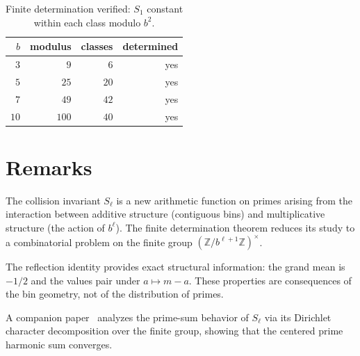 \documentclass[12pt]{amsart}
\theoremstyle{definition}
\theoremstyle{remark}
\begin{document}
\begin{table}[h]
\centering
\begin{tabular}{rrrr}
\toprule
$b$ & modulus & classes & determined \\
\midrule
$3$ & $9$ & $6$ & yes \\
$5$ & $25$ & $20$ & yes \\
$7$ & $49$ & $42$ & yes \\
$10$ & $100$ & $40$ & yes \\
\bottomrule
\end{tabular}
\caption{Finite determination verified: $S_1$ constant
within each class modulo $b^2$.}
\end{table}

\section{Remarks}

The collision invariant $S_{\ell}$ is a new arithmetic
function on primes arising from the interaction between
additive structure (contiguous bins) and multiplicative
structure (the action of $b^{\ell}$). The finite
determination theorem reduces its study to a
combinatorial problem on the finite group
$(\mathbb{Z}/b^{\ell+1}\mathbb{Z})^{\times}$.

The reflection identity provides exact structural
information: the grand mean is $-1/2$ and the values
pair under $a \mapsto m - a$. These properties are
consequences of the bin geometry, not of the distribution
of primes.

A companion paper~\cite{paperB} analyzes the prime-sum
behavior of $S_{\ell}$ via its Dirichlet character
decomposition over the finite group, showing that the
centered prime harmonic sum converges.
\end{document}
